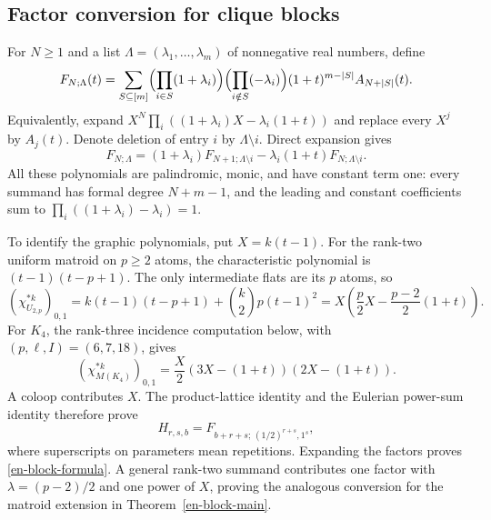 \documentclass[12pt]{amsart}
\theoremstyle{definition}
\theoremstyle{remark}
\numberwithin{equation}{section}
\begin{document}
\subsection{Factor conversion for clique blocks}
For $N\geq1$ and a list $\Lambda=(\lambda_1,\ldots,\lambda_m)$ of nonnegative real numbers, define
\begin{equation}\label{en-factor-def}
 F_{N;\Lambda}(t)=
 \sum_{S\subseteq[m]}
 \Bigl(\prod_{i\in S}(1+\lambda_i)\Bigr)
 \Bigl(\prod_{i\notin S}(-\lambda_i)\Bigr)
 (1+t)^{m-|S|}A_{N+|S|}(t).
\end{equation}
Equivalently, expand $X^N\prod_i((1+\lambda_i)X-\lambda_i(1+t))$ and replace every $X^j$ by $A_j(t)$. Denote deletion of entry $i$ by $\Lambda\setminus i$. Direct expansion gives
\begin{equation}\label{en-factor-insert}
 F_{N;\Lambda}=(1+\lambda_i)F_{N+1;\Lambda\setminus i}
                  -\lambda_i(1+t)F_{N;\Lambda\setminus i}.
\end{equation}
All these polynomials are palindromic, monic, and have constant term one: every summand has formal degree $N+m-1$, and the leading and constant coefficients sum to $\prod_i((1+\lambda_i)-\lambda_i)=1$.

To identify the graphic polynomials, put $X=k(t-1)$. For the rank-two uniform matroid on $p\geq2$ atoms, the characteristic polynomial is $(t-1)(t-p+1)$. The only intermediate flats are its $p$ atoms, so
\[
 (\chi_{U_{2,p}}^{*k})_{0,1}
 =k(t-1)(t-p+1)+\binom{k}{2}p(t-1)^2
 =X\left(\frac p2X-\frac{p-2}{2}(1+t)\right).
\]
For $K_4$, the rank-three incidence computation below, with $(p,\ell,I)=(6,7,18)$, gives
\begin{equation}\label{en-k4-factor}
 (\chi_{M(K_4)}^{*k})_{0,1}
 =\frac X2(3X-(1+t))(2X-(1+t)).
\end{equation}
A coloop contributes $X$. The product-lattice identity and the Eulerian power-sum identity therefore prove
\begin{equation}\label{en-block-factor-conversion}
 H_{r,s,b}=F_{b+r+s;\,(1/2)^{r+s},1^s},
\end{equation}
where superscripts on parameters mean repetitions. Expanding the factors proves \eqref{en-block-formula}. A general rank-two summand contributes one factor with $\lambda=(p-2)/2$ and one power of $X$, proving the analogous conversion for the matroid extension in Theorem~\ref{en-block-main}.
\end{document}
